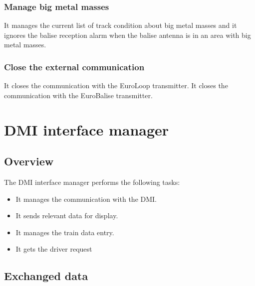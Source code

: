 \documentclass[nocc]{template/openetcs_report}
\begin{document}
\subsection{Manage big metal masses}
It manages the current list of track condition about big metal masses and it ignores the balise reception alarm when the balise antenna is in an area with big metal masses.

\subsection{Close the external communication}
It closes the communication with the EuroLoop transmitter.
It closes the communication with the EuroBalise transmitter.

\chapter{DMI interface manager}
\section{Overview}
The DMI interface manager performs the following tasks:
\begin{itemize}
\item It manages the communication with the DMI.
\item It sends relevant data for display.
\item It manages the train data entry.
\item It gets the driver request
\end{itemize}
\section{Exchanged data}
\end{document}
